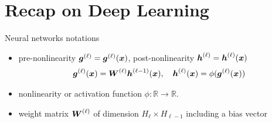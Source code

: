 \documentclass[9pt]{beamer}
\begin{document}




\section{Recap on Deep Learning}

\begin{frame}{Neural networks notations}

\begin{figure}[ht!]
\begin{center}
\scalebox{.8}{

}
\end{center}
\label{figure:nn_visualization_intro}
\end{figure}

\begin{itemize}
	\item \alert{pre-nonlinearity} $\boldsymbol{g}^{(\ell)}=\boldsymbol{g}^{(\ell)}(\boldsymbol{x})$, \alert{post-nonlinearity}  $\boldsymbol{h}^{(\ell)}=\boldsymbol{h}^{(\ell)}(\boldsymbol{x})$
\begin{align*}\label{eq:propagation}
      \boldsymbol{g}^{(\ell)}(\boldsymbol{x}) = \boldsymbol{W}^{(\ell)} \boldsymbol{h}^{(\ell - 1)} (\boldsymbol{x}), \quad \boldsymbol{h}^{(\ell)} (\boldsymbol{x}) = \phi(\boldsymbol{g}^{(\ell)}(\boldsymbol{x}))
\end{align*}
	\item \alert{nonlinearity} or \alert{activation function}  $\phi: \mathbb{R} \to \mathbb{R}$.
	\item \alert{weight matrix} $\boldsymbol{W}^{(\ell)}$ of dimension $H_\ell\times H_{\ell-1}$ including a bias vector
\end{itemize}

\end{frame}
\end{document}
